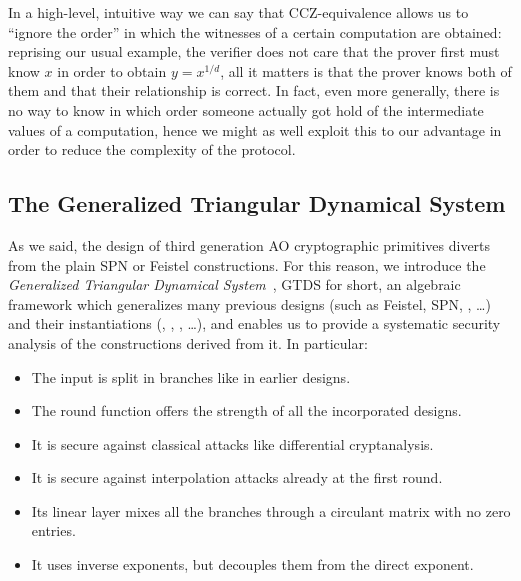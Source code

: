 In a high-level, intuitive way we can say that CCZ-equivalence allows us to ``ignore the order'' 
in which the witnesses of a certain computation are obtained: reprising our usual example,
the verifier does not care that the prover first must know \(x\) in order to obtain \(y = x^{1/d}\), 
all it matters is that the prover knows both of them and that their relationship is correct.
In fact, even more generally, there is no way to know in which order someone actually got hold of 
the intermediate values of a computation, hence we might as well exploit this to our advantage in 
order to reduce the complexity of the protocol.

\subsection{The Generalized Triangular Dynamical System}
As we said, the design of third generation AO cryptographic primitives diverts from the plain 
SPN or Feistel constructions.
For this reason, we introduce the \emph{Generalized Triangular Dynamical System}~\cite{RoyS2022}, 
GTDS for short, an algebraic framework which generalizes many previous designs (such as Feistel, 
SPN, \Horst{}, \dots) and their instantiations (\Mimc{}, \Poseidon{}, \Griffin{}, \dots), and enables 
us to provide a systematic security analysis of the constructions derived from it.
In particular:
\begin{itemize}
  \item The input is split in branches like in earlier designs.
  \item The round function offers the strength of all the incorporated designs.
  \item It is secure against classical attacks like differential cryptanalysis.
  \item It is secure against interpolation attacks already at the first round.
  \item Its linear layer mixes all the branches through a circulant matrix with no zero entries.  
  \item It uses inverse exponents, but decouples them from the direct exponent. 
\end{itemize}

